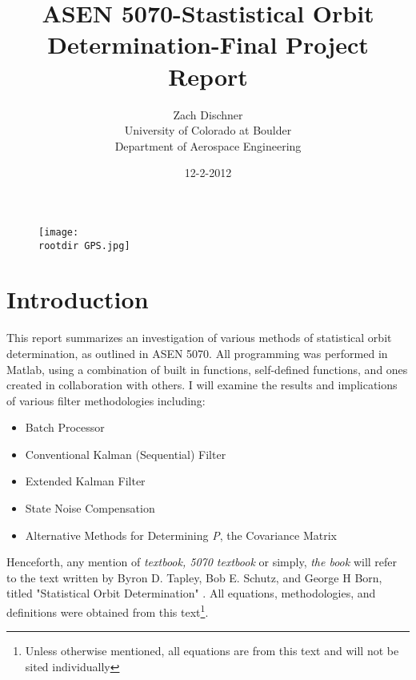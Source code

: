 \documentclass[12pt,a4paper,oneside]{article}
\numberwithin{equation}{section}   		%
\newcommand{\rootdir}{./Figures/}
\begin{document}
\title{ASEN 5070-Stastistical Orbit Determination-Final Project Report}
\author{Zach Dischner \\ University of Colorado at Boulder \\ Department of Aerospace Engineering}
\date{12-2-2012}
\maketitle

\begin{center}
	\begin{figure}[H]
		\texttt{[image: \\rootdir GPS.jpg]}    \cite{GPS}
	\end{figure}
\end{center}


\newpage
\section{Introduction}
This report summarizes an investigation of various methods of statistical orbit determination, as outlined in ASEN 5070. All programming was performed in Matlab, using a combination of built in functions,  self-defined functions, and ones created in collaboration with others. I will examine the results and implications of various filter methodologies including:

\begin{itemize}
	\renewcommand{\labelitemi}{$\bullet$}
	\item Batch Processor
	\item Conventional Kalman (Sequential) Filter
	\item Extended Kalman Filter
	\item State Noise Compensation
	\item Alternative Methods for Determining \emph{P}, the Covariance Matrix
\end{itemize}

Henceforth, any mention of \emph{textbook, 5070 textbook} or simply, \emph{the book} will refer to the text written by Byron D. Tapley, Bob E. Schutz,  and George H Born, titled "Statistical Orbit Determination" \cite{tapley2004statistical}.  All equations, methodologies, and definitions were obtained from this text\footnote{Unless otherwise mentioned, all equations are from this text and will not be sited individually}.
\end{document}
